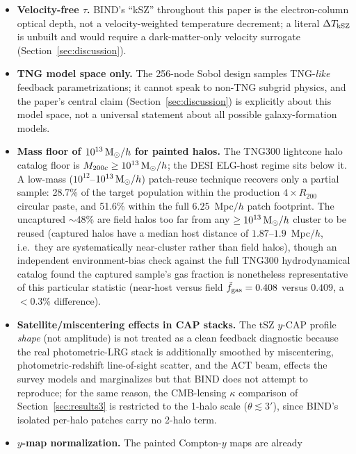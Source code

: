 \documentclass[11pt]{article}
\newcommand{\fgt}{\tilde{f}_{\rm gas}}          %
\newcommand{\Msun}{{\rm M}_\odot}
\newcommand{\Mhalo}{M_{200c}}
\begin{document}
\begin{itemize}
\item \textbf{Velocity-free $\tau$.} BIND's ``kSZ'' throughout this paper is
the electron-column optical depth, not a velocity-weighted temperature
decrement; a literal $\Delta T_{\rm kSZ}$ is unbuilt and would require a
dark-matter-only velocity surrogate (Section~\ref{sec:discussion}). %
\item \textbf{TNG model space only.} The 256-node Sobol design samples
TNG-\emph{like} feedback parametrizations; it cannot speak to non-TNG subgrid
physics, and the paper's central claim (Section~\ref{sec:discussion}) is
explicitly about this model space, not a universal statement about all
possible galaxy-formation models.
\item \textbf{Mass floor of $10^{13}\,\Msun/h$ for painted halos.} The TNG300
lightcone halo catalog floor is $\Mhalo\geq10^{13}\,\Msun/h$; the DESI
ELG-host regime sits below it. A low-mass ($10^{12}$--$10^{13}\,\Msun/h$)
patch-reuse technique recovers only a partial sample: 28.7\% of the target
population within the production $4\times R_{200}$ circular paste, and 51.6\%
within the full $6.25$~Mpc$/h$ patch footprint. %
The uncaptured $\sim$48\% are field halos too far from any $\geq10^{13}\,\Msun/h$
cluster to be reused (captured halos have a median host distance of
$1.87$--$1.9$~Mpc$/h$, i.e.\ they are systematically near-cluster rather than
field halos), though an independent environment-bias check against the full
TNG300 hydrodynamical catalog found the captured sample's gas fraction is
nonetheless representative of this particular statistic (near-host versus
field $\fgt=0.408$ versus $0.409$, a $<0.3$\% difference). %
\item \textbf{Satellite/miscentering effects in CAP stacks.} The tSZ $y$-CAP
profile \emph{shape} (not amplitude) is not treated as a clean feedback
diagnostic because the real photometric-LRG stack is additionally smoothed by
miscentering, photometric-redshift line-of-sight scatter, and the ACT beam,
effects the survey models and marginalizes but that BIND does not attempt to
reproduce; for the same reason, the CMB-lensing $\kappa$ comparison of
Section~\ref{sec:results3} is restricted to the 1-halo scale
($\theta\lesssim3'$), since BIND's isolated per-halo patches carry no 2-halo
term. %
\item \textbf{$y$-map normalization.} The painted Compton-$y$ maps are already

\end{itemize}
\end{document}
